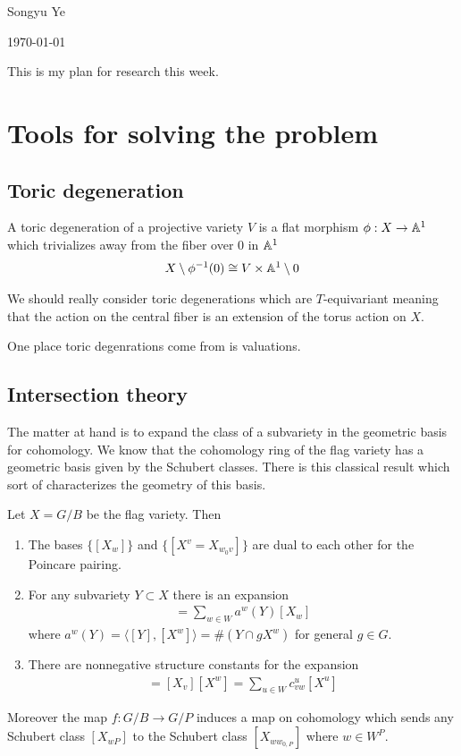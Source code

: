 \documentclass[12pt]{article}
\begin{document}
Songyu Ye

\today

\hfill

This is my plan for research this week.

\section{Tools for solving the problem}
\subsection{Toric degeneration}
\begin{definition}
	A toric degeneration of a projective variety $V$ is a flat morphism $\phi: X\to \mathbb{A}^1$ which
	trivializes away from the fiber over $0$ in $\mathbb{A}^1$ \begin{align*}
		X\setminus \phi^{-1}(0) \cong V\times \mathbb{A}^1\setminus 0
	\end{align*}
\end{definition}
We should really consider toric degenerations which are $T$-equivariant meaning that 
the action on the central fiber is an extension of the torus action on $X$.

\hfill

One place toric degenrations come from is valuations.

\hfill


\subsection{Intersection theory}
The matter at hand is to expand the class of a subvariety in the geometric basis for cohomology.
We know that the cohomology ring of the flag variety has a geometric basis given by the Schubert classes.
There is this classical result which sort of characterizes the geometry of this basis.

\begin{theorem}
	Let $X = G/B$ be the flag variety. Then
	\begin{enumerate}
		\item The bases $\{[X_w]\}$ and $\{[X^v = X_{w_0v}]\}$ are dual to each other for the Poincare pairing.
		\item For any subvariety $Y\subset X$ there is an expansion \begin{align*}
			      [Y] = \sum_{w\in W}a^w(Y) [X_w]
		      \end{align*} where $a^w(Y) = \langle [Y], [X^w]\rangle = \#(Y\cap gX^w)$ for general $g\in G$.
		\item There are nonnegative structure constants for the expansion \begin{align*}
			      [X_v^{w_0w}]= [X_v][X^w] = \sum_{u\in W}c_{vw}^u[X^u]
		      \end{align*}
	\end{enumerate}
	Moreover the map $f:G/B\to G/P$ induces a map on cohomology which sends any Schubert class $[X_{wP}]$ to
	the Schubert class $[X_{ww_{0,P}}]$ where $w\in W^P$.
\end{theorem}
\end{document}
